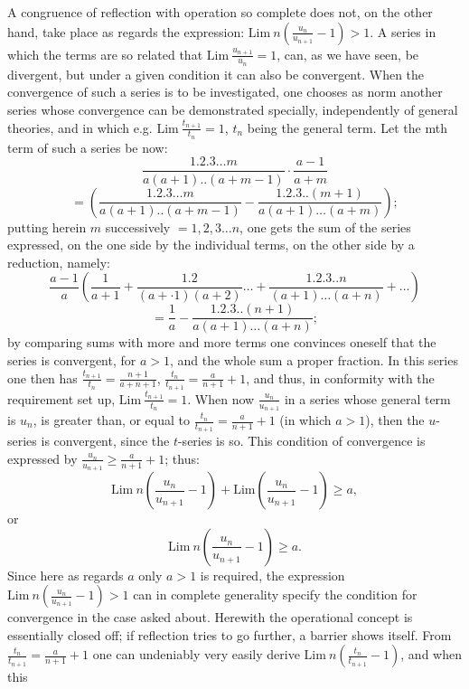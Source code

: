 \documentclass[12pt,a4paper,openany]{book}
\newcommand{\opage}[1]{\marginnote{\footnotesize\textit{[#1]}}}
\begin{document}
A congruence of reflection with operation so complete does not, on the other hand, take place as regards the expression: $\mathrm{Lim}\ n\left(\frac{u_{n}}{u_{n+1}}-1\right)>1$. A series in which the terms are so related that $\mathrm{Lim}\ \frac{u_{n+1}}{u_{n}}=1$, can, as we have seen, be divergent, but under a given condition it can also be convergent. When the convergence of such a series is to be investigated, one chooses as norm another series whose convergence can be demonstrated specially, independently of general theories, and in which e.g. $\mathrm{Lim}\ \frac{t_{n+1}}{t_{n}}=1$, $t_{n}$ being the general term. Let the mth term of such a series be now: %
\[ \frac{1.2.3\ldots m}{a(a+1)..(a+m-1)}\cdot\frac{a-1}{a+m} \]
\[ =\left(\frac{1.2.3\ldots m}{a(a+1)..(a+m-1)}-\frac{1.2.3..(m+1)}{a(a+1)\ldots(a+m)}\right) ; \]
putting herein $m$ successively $=1,2,3\ldots n$, one gets the sum of the series expressed, on the one side by the individual terms, on the other side by a reduction, namely:
\[ \frac{a-1}{a}\left(\frac{1}{a+1}+\frac{1.2}{(a+\cdot 1)(a+2)}\ldots+\frac{1.2.3..n}{(a+1)\ldots(a+n)}+\ldots\right) \]
\[ =\frac{1}{a}-\frac{1.2.3..(n+1)}{a(a+1)\ldots(a+n)} ; \]
by comparing sums
with more and more terms one convinces oneself that the series is
convergent, for $a>1$, and the whole sum a proper fraction.
In this series one then has $\frac{t_{n+1}}{t_{n}}=\frac{n+1}{a+n+1}$, $\frac{t_{n}}{t_{n+1}}=\frac{a}{n+1}+1$, and thus, in conformity with the requirement set up, $\mathrm{Lim}\ \frac{t_{n+1}}{t_{n}}=1$. When now $\frac{u_{n}}{u_{n+1}}$ in a
\setcounter{footnote}{0}%
\opage{68}series whose general term is $u_{n}$, is greater than, or equal to $\frac{t_{n}}{t_{n+1}}=\frac{a}{n+1}+1$ (in which $a>1$), then the $u$-series is convergent, since the $t$-series is so. This condition of convergence
is expressed by $\frac{u_{n}}{u_{n+1}}\geq\frac{a}{n+1}+1$; thus:
\[ \mathrm{Lim}\ n\left(\frac{u_{n}}{u_{n+1}}-1\right)+\mathrm{Lim}\left(\frac{u_{n}}{u_{n+1}}-1\right)\geq a, \]
or
\[ \mathrm{Lim}\ n\left(\frac{u_{n}}{u_{n+1}}-1\right)\geq a. \]
Since here as regards $a$ only $a>1$ is required, the expression $\mathrm{Lim}\ n\left(\frac{u_{n}}{u_{n+1}}-1\right)>1$ can in complete
generality specify the condition for convergence in the case asked about. Herewith the operational concept is
essentially closed off; if reflection tries to go further,
a barrier shows itself. From
$\frac{t_{n}}{t_{n+1}}=\frac{a}{n+1}+1$ one can undeniably very easily derive $\mathrm{Lim}\ n\left(\frac{t_{n}}{t_{n+1}}-1\right)$, and when this
\end{document}
